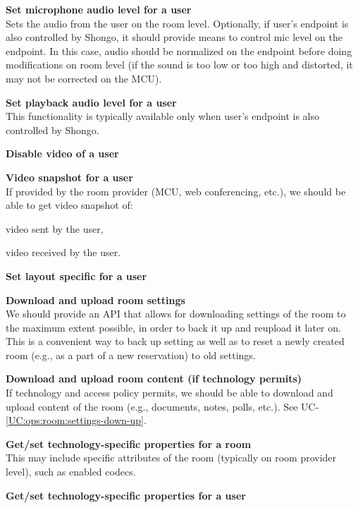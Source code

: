 \documentclass[a4paper]{report}
\makeatletter
\newcounter{UCcounter}
\newenvironment{UseCases}%
	{\begin{list}{\textbf{UC-\arabic{UCcounter}}}{\@nmbrlisttrue\def\@listctr{UCcounter}}}%
	{\end{list}}
\newcommand{\UClabel}[1]{\label{UC:#1}}
\newcommand{\UCref}[1]{UC-\ref{UC:#1}}
\newcommand{\UseCase}[2]{\item\UClabel{#2} \textbf{#1}\\}
\makeatother
\begin{document}
\begin{UseCases}
\UseCase{Set microphone audio level for a user}{ops:room:user-miclevel}

Sets the audio from the user on the room level. Optionally, if user's endpoint
is also controlled by Shongo, it should provide means to control mic level on
the endpoint. In this case, audio should be normalized on the endpoint before
doing modifications on room level (if the sound is too low or too high and
distorted, it may not be corrected on the MCU).

\UseCase{Set playback audio level for a user}{ops:room:user-playlevel}

This functionality is typically available only when user's endpoint is also
controlled by Shongo.

\UseCase{Disable video of a user}{ops:room:user-video-off}

\UseCase{Video snapshot for a user}{ops:room:user-video-snap}

If provided by the room provider (MCU, web conferencing, etc.), we should be
able to get video snapshot of:

\begin{compactitem}

\item video sent by the user,

\item video received by the user.

\end{compactitem}


\UseCase{Set layout specific for a user}{ops:room:user-layout}

\UseCase{Download and upload room settings}{ops:room:settings-down-up}

We should provide an API that allows for downloading settings of the room to
the maximum extent possible, in order to back it up and reupload it later on.
This is a convenient way to back up setting as well as to reset a newly created
room (e.g., as a part of a new reservation) to old settings.

\UseCase{Download and upload room content (if technology
permits)}{ops:room:content-down-up}

If technology and access policy permits, we should be able to download and
upload content of the room (e.g., documents, notes, polls, etc.). See
\UCref{ops:room:settings-down-up}.

\UseCase{Get/set technology-specific properties for a
room}{ops:room:room-techspec}

This may include specific attributes of the room (typically on room provider
level), such as enabled codecs.

\UseCase{Get/set technology-specific properties for a
user}{ops:room:user-techspec}

\end{UseCases}
\end{document}
